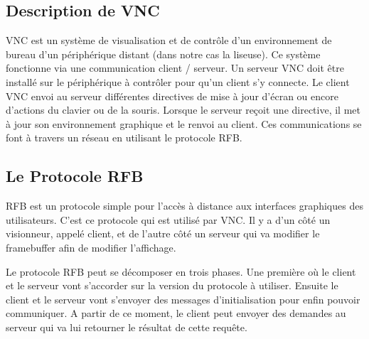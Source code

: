 \subsection{Description de VNC}

VNC est un système de visualisation et de contrôle d'un environnement de bureau d'un périphérique distant (dans notre cas la liseuse). Ce système fonctionne via une communication client / serveur. Un serveur VNC doit être installé sur le périphérique à contrôler pour qu'un client s'y connecte. Le client VNC envoi au serveur différentes directives de mise à jour d'écran ou encore d'actions du clavier ou de la souris. Lorsque le serveur reçoit une directive, il met à jour son environnement graphique et le renvoi au client. Ces communications se font à travers un réseau en utilisant le protocole RFB.

\subsection{Le Protocole RFB}

RFB est un protocole simple pour l'accès à distance aux interfaces graphiques des utilisateurs. C'est ce protocole qui est utilisé par VNC. Il y a d'un côté un visionneur, appelé client, et de l'autre côté un serveur qui va modifier le framebuffer afin de modifier l'affichage.

Le protocole RFB peut se décomposer en trois phases. Une première où le client et le serveur vont s'accorder sur la version du protocole à utiliser. Ensuite le client et le serveur vont s'envoyer des messages d'initialisation pour enfin pouvoir communiquer. A partir de ce moment, le client peut envoyer des demandes au serveur qui va lui retourner le résultat de cette requête.


